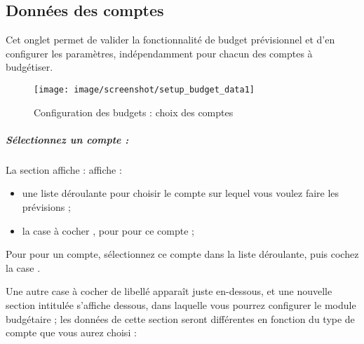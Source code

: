 \subsection{Données des comptes\label{setup-budget-data}}

Cet onglet permet de valider la fonctionnalité de budget prévisionnel et d'en configurer les paramètres, indépendamment pour chacun des comptes à budgétiser. 

\ifIllustration
\begin{figure}[htbp]
\begin{center}
\texttt{[image: image/screenshot/setup\_budget\_data1]}
\end{center}
\caption{Configuration des budgets : choix des comptes}
\label{setup-budgetData1-img}
\end{figure}
\fi

\subparagraph{Sélectionnez un compte :\label{setup-budget-data-select}}

La section  \ifIllustration affiche :
\else affiche : 
\fi

\begin{itemize}
	\item une liste déroulante pour choisir le compte sur lequel vous voulez faire les prévisions ;
	\item la case à cocher , pour  pour ce compte ; 
	
\end{itemize}



Pour  pour un compte, sélectionnez ce compte dans la liste déroulante, puis cochez la case . 

Une autre case à cocher de libellé  apparaît juste en-dessous, et une nouvelle section intitulée  s'affiche dessous, dans laquelle vous pourrez configurer le module budgétaire ; les données de cette section seront différentes en fonction du type de compte que vous aurez choisi :


